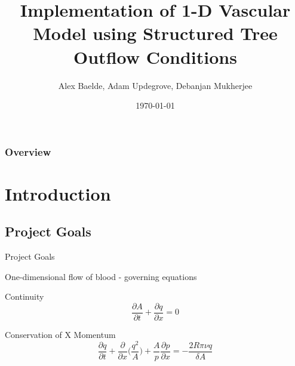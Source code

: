 \documentclass{beamer}
\title[]{Implementation of 1-D Vascular Model using Structured Tree Outflow Conditions} %
\author{Alex Baelde, Adam Updegrove, Debanjan Mukherjee} %
\date{\today} %
\newcommand{\partder}[2]{\frac{\partial #1}{\partial #2}}
\begin{document}
\begin{frame}
\titlepage %
\end{frame}

\begin{frame}
\frametitle{Overview} %
\tableofcontents %
\end{frame}

\section{Introduction}

\subsection{Project Goals}


\begin{frame}{Project Goals}

\end{frame}


\begin{frame}{One-dimensional flow of blood - governing equations}
	\begin{block}{Continuity}
		\begin{equation}
			\label{continuity}
			\partder{A}{t} + \partder{q}{x} = 0
		\end{equation}
	\end{block}

	\begin{block}{Conservation of X Momentum}
		\begin{equation}
			\label{consxmomentum}
			\partder{q}{t} + \partder{}{x}\Bigg(\frac{q^2}{A}\Bigg) + \frac{A}{p}\partder{p}{x} = -\frac{2R\pi \nu q}{\delta A}
		\end{equation}
	\end{block}
	
\end{frame}
\end{document}
